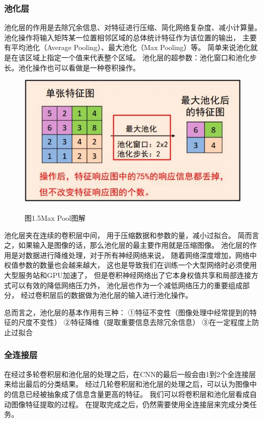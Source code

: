 \documentclass[10.5pt,compsoc,UTF8]{CjC}
\theoremstyle{mystyle}
\begin{document}

\subsubsection{池化层}
池化层的作用是去除冗余信息、对特征进行压缩、简化网络复杂度、减小计算量。
池化操作将输入矩阵某一位置相邻区域的总体统计特征作为该位置的输出，
主要有平均池化（Average Pooling）、最大池化（Max Pooling）等。
简单来说池化就是在该区域上指定一个值来代表整个区域。
池化层的超参数：池化窗口和池化步长。池化操作也可以看做是一种卷积操作。


\begin{figure}[htbp]
\centering
\centerline{\includegraphics[width=0.6\linewidth]{CNN5.png}}
\heiti 图1.5\quad  Max Pool图解
\label{fig1}
\end{figure}
池化层夹在连续的卷积层中间， 用于压缩数据和参数的量，减小过拟合。
简而言之，如果输入是图像的话，那么池化层的最主要作用就是压缩图像。
池化层的作用是对数据进行降维处理，对于所有神经网络来说，
随着网络深度增加，网络中权值参数的数量也会越来越大，
这也是导致我们在训练一个大型网络时必须使用大型服务站和GPU加速了，
但是卷积神经网络出了它本身权值共享和局部连接方式可以有效的降低网络压力外，
池化层也作为一个减低网络压力的重要组成部分，
经过卷积层后的数据做为池化层的输入进行池化操作。

总而言之，池化层的基本作用有三种：
①特征不变性（图像处理中经常提到的特征的尺度不变性）
②特征降维（提取重要信息去除冗余信息）
③在一定程度上防止过拟合

\subsubsection{全连接层}

在经过多轮卷积层和池化层的处理之后，在CNN的最后一般会由1到2个全连接层来给出最后的分类结果。
经过几轮卷积层和池化层的处理之后，可以认为图像中的信息已经被抽象成了信息含量更高的特征。
我们可以将卷积层和池化层看成自动图像特征提取的过程。
在提取完成之后，仍然需要使用全连接层来完成分类任务。
\end{document}
